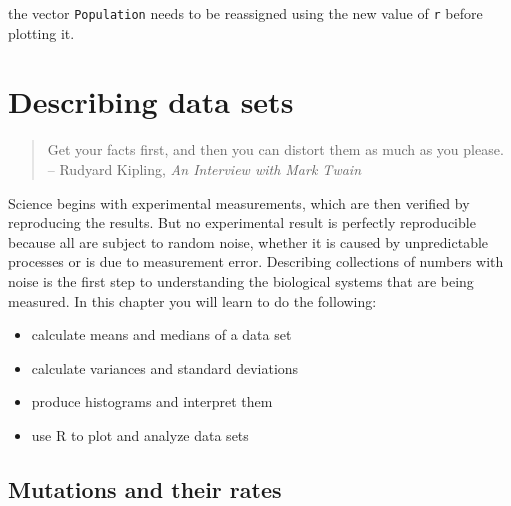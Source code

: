 \documentclass[
  letterpaper,
  DIV=11,
  numbers=noendperiod]{scrreprt}
\begin{document}
\begin{tcolorbox}[enhanced jigsaw, arc=.35mm, colframe=quarto-callout-caution-color-frame, left=2mm, opacitybacktitle=0.6, breakable, title=\textcolor{quarto-callout-caution-color}{\faFire}\hspace{0.5em}{Hint}, toprule=.15mm, coltitle=black, bottomtitle=1mm, toptitle=1mm, colback=white, leftrule=.75mm, colbacktitle=quarto-callout-caution-color!10!white, titlerule=0mm, opacityback=0, rightrule=.15mm, bottomrule=.15mm]

the vector \texttt{Population} needs to be reassigned using the new
value of \texttt{r} before plotting it.

\end{tcolorbox}


\hypertarget{describing-data-sets}{%
\chapter{Describing data sets}\label{describing-data-sets}}

\begin{quote}
Get your facts first, and then you can distort them as much as you
please.\\
-- Rudyard Kipling, \emph{An Interview with Mark Twain}
\end{quote}

Science begins with experimental measurements, which are then verified
by reproducing the results. But no experimental result is perfectly
reproducible because all are subject to random noise, whether it is
caused by unpredictable processes or is due to measurement error.
Describing collections of numbers with noise is the first step to
understanding the biological systems that are being measured. In this
chapter you will learn to do the following:

\begin{itemize}
\item
  calculate means and medians of a data set
\item
  calculate variances and standard deviations
\item
  produce histograms and interpret them
\item
  use R to plot and analyze data sets
\end{itemize}

\hypertarget{mutations-and-their-rates}{%
\section{Mutations and their rates}\label{mutations-and-their-rates}}
\end{document}
